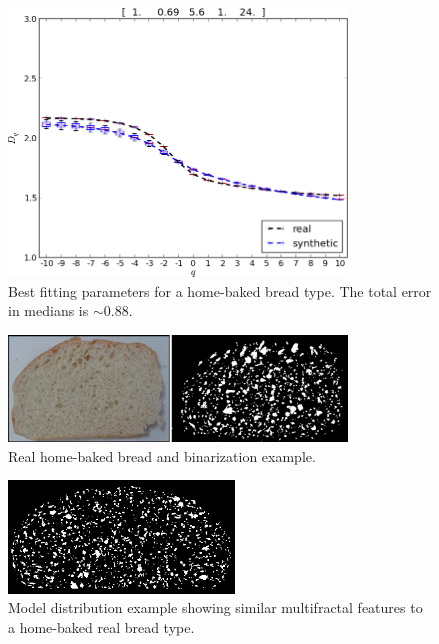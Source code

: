 \begin{figure}[!ht]
\includegraphics[width=9cm]{figures/bestboxplot2}
\caption{Best fitting parameters for a home-baked bread type. The total error in medians is $\sim 0.88$.}
\label{bestboxplot2}
\end{figure}

\begin{figure}[!ht]
\begin{center}
\includegraphics[width=9cm]{figures/realbin2}
\caption{ Real home-baked bread and binarization example.}
\label{realbin2}
\end{center}
\end{figure}

\begin{figure}[!ht]
\begin{center}
\includegraphics[width=6cm]{figures/best2}
\caption{Model distribution example showing similar multifractal features to a home-baked real bread type.}
\label{best2}
\end{center}
\end{figure}



